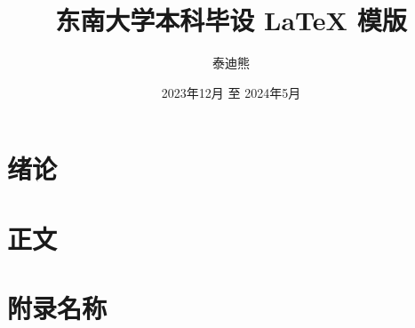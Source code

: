 \documentclass[fontset = mac ms]{seuthesis2024b}
\title{东南大学本科毕设 \LaTeX{} 模版}
\author{泰迪熊}
\date{2023年12月 至 2024年5月}
\begin{document}
  \maketitle

  \chapter{绪论}\label{chap:introduction}
  
    
  \chapter{正文}\label{chap:body}
  


  \chapterBib\label{chap:bib}

  \appendix
  \chapter{附录名称}\label{chap:appendix}
  
  
  \chapterAck
  
\end{document}
